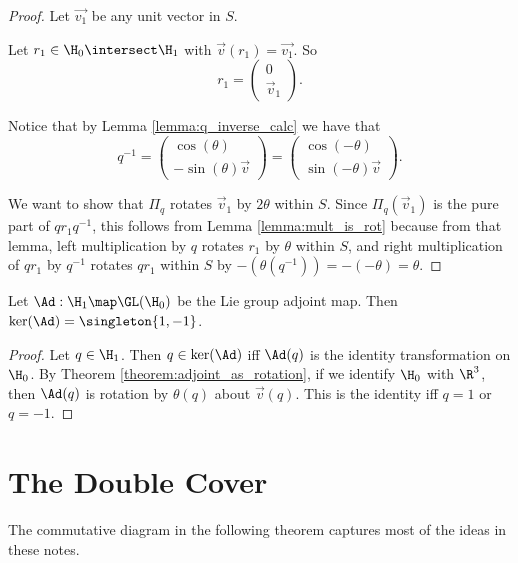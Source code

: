 \documentclass[oneside,12pt]{amsart}
\begin{document}
\begin{proof}
Let $\vec{v_1}$ be any unit vector in $S$.  

Let $r_1\in\H_0\intersect\H_1$ with
$\vec{v}(r_1)=\vec{v_1}$. So
$$r_1 = \begin{pmatrix} 0 \\ \vec{v}_1 \end{pmatrix}.$$

Notice that by Lemma \ref{lemma:q_inverse_calc} we have that
$$q^{-1} = \begin{pmatrix} \cos(\theta) \\ -\sin(\theta) \vec{v} \end{pmatrix}
= \begin{pmatrix} \cos(-\theta) \\ \sin(-\theta) \vec{v} \end{pmatrix}.$$


We want to show that $\Pi_q$ rotates $\vec{v}_1$ by $2\theta$ within $S$.
Since $\Pi_q(\vec{v}_1)$ is the pure part of $q r_1 q^{-1}$, this follows from 
Lemma \ref{lemma:mult_is_rot} because from that lemma, left multiplication by $q$
rotates $r_1$ by $\theta$ within $S$, and right multiplication of $q r_1$ by $q^{-1}$ rotates $q r_1$ within $S$ by
$-(\theta(q^{-1})) = -(-\theta) = \theta$.
\end{proof}

\begin{corollary}
\label{corollar:ker_adj}
Let $\Ad:\H_1 \map \GL(\H_0)$ be the Lie group adjoint map. Then $\ker(\Ad) = \singleton{1,-1}$.
\end{corollary}
\begin{proof}
Let $q\in\H_1$. Then $q\in\ker(\Ad)$ iff $\Ad(q)$ is the identity transformation on $\H_0$. By Theorem 
\ref{theorem:adjoint_as_rotation},
if we identify $\H_0$ with $\R^3$, then $\Ad(q)$ is rotation by $\theta(q)$ about $\vec{v}(q)$. This
is the identity iff $q=1$ or $q=-1$.
\end{proof}

\section{The Double Cover}

The commutative diagram in the following theorem captures most of the ideas in these notes.
\end{document}
